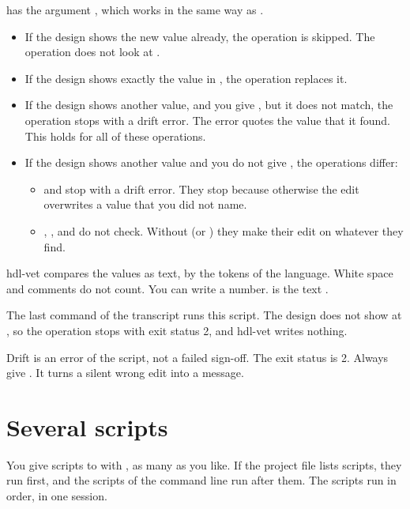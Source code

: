  has the argument
, which works in the same way as .

\begin{itemize}
\item If the design shows the new value already, the operation is skipped.
  The operation does not look at .
\item If the design shows exactly the value in , the operation
  replaces it.
\item If the design shows another value, and you give , but it does not match,
  the operation stops with a drift error. The error quotes the value that it found.
  This holds for all of these operations.
\item If the design shows another value and you do not give , the
  operations differ:
  \begin{itemize}
  \item {} and  stop
    with a drift error. They stop because otherwise the edit overwrites a value
    that you did not name.
  \item {}, ,
     and  do not
    check. Without  (or ) they make their edit on whatever they
    find.
  \end{itemize}
\end{itemize}

hdl-vet compares the values as text, by the tokens of the language. White space and
comments do not count. You can write a number.  is the text
.

The last command of the transcript runs this script. The design does not show
 at , so the operation stops with exit status 2, and
hdl-vet writes nothing.



Drift is an error of the script, not a failed sign-off. The exit status is 2.
Always give . It turns a silent wrong edit into a message.

\section{Several scripts}

You give scripts to  with , as many as you like. If the
project file lists scripts, they run first, and the scripts of the command line
run after them. The scripts run in order, in one session.

